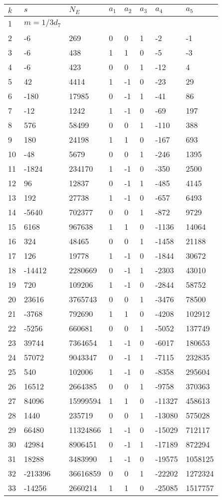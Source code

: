 \documentclass{amsart}
\begin{document}
\begin{longtable}{|l|l|l|lllll|}
\hline
$k$ & $s$ & $N_E$ & $a_1$ & $a_2$ & $a_3$ & $a_4$ & $a_5$\\
\hline
1&$m=1/3d_{7}$&&\multicolumn{5}{c|}{}\\
2&-6&269&0&0&1&-2&-1\\
3&-6&438&1&1&0&-5&-3\\
4&-6&423&0&0&1&-12&4\\
5&42&4414&1&-1&0&-23&29\\
6&-180&17985&0&-1&1&-41&86\\
7&-12&1242&1&-1&0&-69&197\\
8&576&58499&0&0&1&-110&388\\
9&180&24198&1&1&0&-167&693\\
10&-48&5679&0&0&1&-246&1395\\
11&-1824&234170&1&-1&0&-350&2500\\
12&96&12837&0&-1&1&-485&4145\\
13&192&27738&1&-1&0&-657&6493\\
14&-5640&702377&0&0&1&-872&9729\\
15&6168&967638&1&1&0&-1136&14064\\
16&324&48465&0&0&1&-1458&21188\\
17&126&19778&1&-1&0&-1844&30672\\
18&-14412&2280669&0&-1&1&-2303&43010\\
19&720&109206&1&-1&0&-2844&58752\\
20&23616&3765743&0&0&1&-3476&78500\\
21&-3768&792690&1&1&0&-4208&102912\\
22&-5256&660681&0&0&1&-5052&137749\\
23&39744&7364654&1&-1&0&-6017&180653\\
24&57072&9043347&0&-1&1&-7115&232835\\
25&540&102006&1&-1&0&-8358&295604\\
26&16512&2664385&0&0&1&-9758&370363\\
27&84096&15999594&1&1&0&-11327&458613\\
28&1440&235719&0&0&1&-13080&575028\\
29&66480&11324866&1&-1&0&-15029&712117\\
30&42984&8906451&0&-1&1&-17189&872294\\
31&18288&3483990&1&-1&0&-19575&1058125\\
32&-213396&36616859&0&0&1&-22202&1272324\\
33&-14256&2660214&1&1&0&-25085&1517757\\

\end{longtable}
\end{document}
